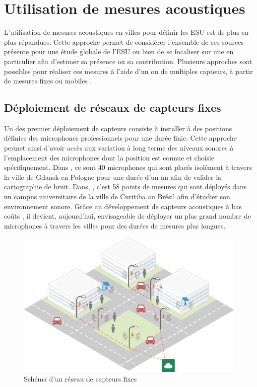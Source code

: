 \section{Utilisation de mesures acoustiques}

L'utilisation de mesures acoustiques en villes pour définir les ESU est de plus en plus répandues. Cette approche permet de considérer l'ensemble de ces sources présente pour une étude globale de l'ESU ou bien de se focaliser sur une en particulier afin d'estimer sa présence ou sa contribution. 
Plusieurs approches sont possibles pour réaliser ces mesures à l'aide d'un ou de multiples capteurs, à partir de mesures fixes ou mobiles .

\subsection{Déploiement de réseaux de capteurs fixes}

Un des premier déploiement de capteurs consiste à installer à des positions définies des microphones professionnels pour une durée finie. Cette approche permet ainsi d'avoir accès aux variation à long terme des niveaux sonores à l'emplacement des microphones dont la position est connue et choisie spécifiquement.
Dans \cite{Mioduszewski}, ce sont 40 microphones qui sont placés isolément à travers la ville de Gdansk en Pologne pour une durée d'un an afin de valider la cartographie de bruit. Dans, \cite{zannin_characterization_2013}, c'est 58 points de mesures qui sont déployés dans un campus universitaire de la ville de Curitiba au Brésil afin d'étudier son environnement sonore. Grâce au développement de capteurs acoustiques à bas coûts \cite{van2010use}, il devient, aujourd'hui, envisageable de déployer un plus grand nombre de microphones à travers les villes pour des durées de mesures plus longues. 

\begin{figure}[t]
\centering
\includegraphics[width=0.8\linewidth]{./figures/cartographie/reseau_mesure.png}
\caption{Schéma d'un réseau de capteurs fixes}
\label{fig:reseau_capteur}
\end{figure}


